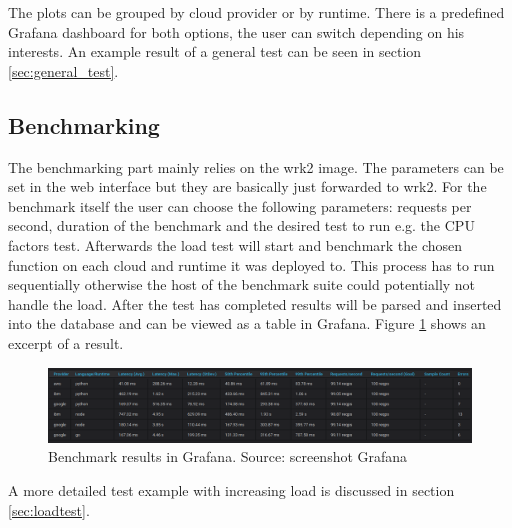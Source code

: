 The plots can be grouped by cloud provider or by runtime. There is a predefined Grafana dashboard for both options, the user can switch depending on his interests. An example result of a general test can be seen in section \ref{sec:general_test}.


\subsection{Benchmarking}
The benchmarking part mainly relies on the wrk2 image. The parameters can be set in the web interface but they are basically just forwarded to wrk2. For the benchmark itself the user can choose the following parameters: requests per second, duration of the benchmark and the desired test to run e.g. the \gls{CPU} factors test. Afterwards the load test will start and benchmark the chosen function on each cloud and runtime it was deployed to. This process has to run sequentially otherwise the host of the benchmark suite could potentially not handle the load. After the test has completed results will be parsed and inserted into the database and can be viewed as a table in Grafana. Figure \ref{fig:benchmark_table} shows an excerpt of a result.

\begin{figure}[htp]
\begin{center}
\includegraphics[width=1\textwidth]{bilder/benchmark_table.png}
\captionsetup{justification=centering, labelfont=bf}
\caption[Benchmark results in Grafana]{Benchmark results in Grafana. Source: screenshot Grafana}
\label{fig:benchmark_table}
\end{center}
\end{figure}

A more detailed test example with increasing load is discussed in section \ref{sec:loadtest}.

